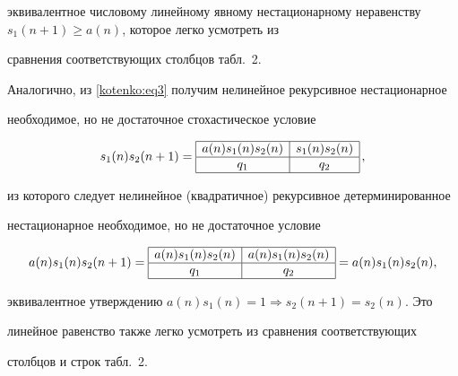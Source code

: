 эквивалентное числовому линейному явному нестационарному неравенству $s_1 (n+1)\ge a ( n )$, которое легко усмотреть из

сравнения соответствующих столбцов табл.~2.



Аналогично, из \eqref{kotenko:eq3} получим нелинейное рекурсивное нестационарное

необходимое, но не достаточное стохастическое условие

\[

s_1 ( n )s_2 ( n+1 )= \begin{array}{|c|c|} \hline

a( n )s_1 ( n )s_2 ( n ) & s_1 ( n ) s_2 ( n ) \\ \hline

q_1  & q_2 \\ \hline

\end{array}\,,

\]

из которого следует нелинейное (квадратичное) рекурсивное детерминированное

нестационарное необходимое, но не достаточное условие

\[

a ( n )s_1 ( n )s_2 (n+1)= \begin{array}{|c|c|} \hline

a( n )s_1 ( n )s_2 ( n ) & a ( n )s_1 ( n )s_2 ( n ) \\ \hline

q_1  & q_2 \\ \hline

\end{array} =a( n )s_1 ( n )s_2 ( n ),

\]

эквивалентное утверждению $a( n )s_1 ( n )=1 \Rightarrow s_2 ( n+1 )=s_2 ( n )$. Это

линейное равенство также легко усмотреть из сравнения соответствующих

столбцов и строк табл.~2.



